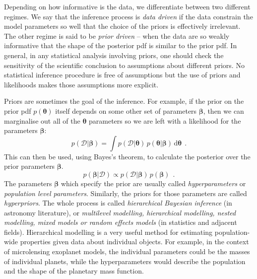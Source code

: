 \documentclass[12pt,dvipsnames]{report}
\newcommand{\ud}{\,\mathrm{d}}
\renewcommand{\vec}[1]{\boldsymbol{\mathbf{#1}}}
\newcommand{\hquad}{~~}
\begin{document}
Depending on how informative is the data, we differentiate between two different
regimes. We say that the inference process is \emph{data driven} if the data
constrain the model parameters so well that the choice of the priors is
effectively irrelevant. The other regime is said to be \emph{prior driven} -- 
when the data are so weakly informative that the shape of the posterior pdf is
similar to the prior pdf. In general, in any statistical analysis involving
priors, one should check the sensitivity of the scientific conclusion to
assumptions about different priors. No statistical inference procedure is free of
assumptions but the use of priors and likelihoods makes those assumptions more
explicit.

Priors are sometimes the goal of the inference. For example, if the prior on
the prior pdf $p(\vec{\theta})$ itself depends on some other set of parameters
$\vec{\beta}$, then we can marginalise out all of the $\vec{\theta}$ parameters
so we are left with a likelihood for the parameters $\vec{\beta}$:
\begin{equation}
    p(\mathcal{D}\lvert\vec{\beta})=\int p(\mathcal{D}\lvert\vec{\theta})\,p(\vec{\theta}\lvert
    \vec{\beta})\ud \vec{\theta}
    \hquad.
\end{equation}
This can then be used, using Bayes's theorem, to calculate the posterior
over the prior parameters $\bm\beta$.
\begin{equation}
    p(\bm\beta\lvert\mathcal{D})\propto p(\mathcal{D}\lvert\vec{\beta})
    \,p(\bm\beta)
    \hquad.
\end{equation}
The parameters $\bm\beta$ which specify the prior are usually called
\emph{hyperparameters} or \emph{population level parameters}. Similarly, the priors
for those parameters are called \emph{hyperpriors}.
The whole process is called \emph{hierarchical Bayesian inference}
(in astronomy literature),  or \emph{multilevel modelling, hierarchical modelling,
    nested modelling, mixed models or random effects models}
(in statistics and adjacent fields).
Hierarchical modelling is a very useful method for estimating
population-wide properties given data about individual objects. For example,
in the context of microlensing exoplanet models, 
the individual parameters could be the
masses of individual planets, while the hyperparameters would describe the
population and the shape of the planetary mass function. 
\end{document}
